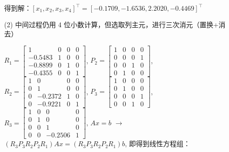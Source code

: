 \documentclass{article}
\begin{document}
\begin{itemize}
\begin{itemize}
        得到解：$[x_1, x_2, x_3, x_4] ^ \top = [-0.1709, -1.6536,  2.2020,  -0.4469]^\top$

        \item [(2)] 中间过程仍用 4 位小数计算，但选取列主元，进行三次消元（置换+消去）
        
        $R_1 = \left[\begin{array}{cccc}
            1 &    0 &    0 &    0 \\ -0.5483 &    1 &    0 &    0 \\ -0.8899 &    0 &    1 &    0 \\ -0.4355 &    0 &    0 &    1
        \end{array}\right]$,
        $P_2 = \left[\begin{array}{cccc}
            1 &    0 &    0 &    0 \\    0 &    0 &    0 &    1 \\    0 &    0 &    1 &    0 \\    0 &    1 &    0 &    0
     \end{array}\right]$,
        $R_2 = \left[\begin{array}{cccc}
            1 &    0 &    0 &    0 \\    0 &    1 &    0 &    0 \\    0 & -0.2372 &    1 &    0 \\    0 & -0.9221 &    0 &    1
     \end{array}\right]$,
        $P_3 = \left[\begin{array}{cccc}
            1 &    0 &    0 &    0 \\    0 &    1 &    0 &    0 \\    0 &    0 &    0 &    1 \\    0 &    0 &    1 &    0
     \end{array}\right]$,
        $R_3 = \left[ \begin{array}{cccc}
            1 &    0 &    0 &    0 \\    0 &    1 &    0 &    0 \\    0 &    0 &    1 &    0 \\    0 &    0 & -0.2506 &    1
     \end{array}\right]$, 
        $Ax = b$ $\to$ $(R_3P_3R_2P_2R_1)Ax = (R_3P_3R_2P_2R_1)b$, 即得到线性方程组：


\end{itemize}
\end{itemize}
\end{document}
